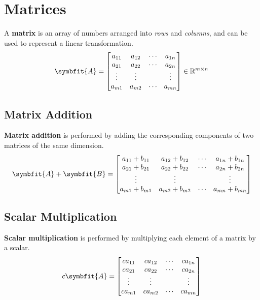 \documentclass{article}
\begin{document}
\section{Matrices}
\begin{definition}
    A \textbf{matrix} is an array of numbers arranged into \textit{rows}
    and \textit{columns}, and can be used to represent a linear
    transformation.
    \begin{equation*}
        \symbfit{A} =
        \begin{bmatrix}
            a_{11} & a_{12} & \cdots & a_{1n} \\
            a_{21} & a_{22} & \cdots & a_{2n} \\
            \vdots & \vdots &        & \vdots \\
            a_{m1} & a_{m2} & \cdots & a_{mn} \\
        \end{bmatrix}
        \in \mathbb{R}^{m \times n}
    \end{equation*}
\end{definition}
\subsection{Matrix Addition}
\begin{definition}
    \textbf{Matrix addition} is performed by adding the corresponding
    components of two matrices of the same dimension.
    \begin{equation*}
        \symbfit{A} + \symbfit{B} =
        \begin{bmatrix}
            a_{11} + b_{11} & a_{12} + b_{12} & \cdots & a_{1n} + b_{1n} \\
            a_{21} + b_{21} & a_{22} + b_{22} & \cdots & a_{2n} + b_{2n} \\
            \vdots          & \vdots          &        & \vdots          \\
            a_{m1} + b_{m1} & a_{m2} + b_{m2} & \cdots & a_{mn} + b_{mn} \\
        \end{bmatrix}
    \end{equation*}
\end{definition}
\subsection{Scalar Multiplication}
\begin{definition}
    \textbf{Scalar multiplication} is performed by multiplying each
    element of a matrix by a scalar.
    \begin{equation*}
        c\symbfit{A} =
        \begin{bmatrix}
            ca_{11} & ca_{12} & \cdots & ca_{1n} \\
            ca_{21} & ca_{22} & \cdots & ca_{2n} \\
            \vdots  & \vdots  &        & \vdots  \\
            ca_{m1} & ca_{m2} & \cdots & ca_{mn} \\
        \end{bmatrix}
    \end{equation*}
\end{definition}
\end{document}
